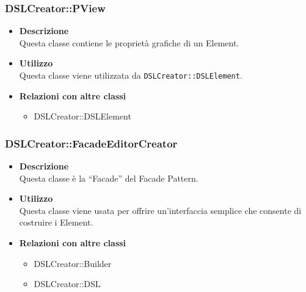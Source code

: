         \subsubsection{DSLCreator::PView}
        \begin{itemize}
        \item \textbf{Descrizione} \hfill \\
          Questa classe contiene le proprietà grafiche di un  Element.
        \item \textbf{Utilizzo}  \hfill \\
          Questa classe viene utilizzata da \texttt{DSLCreator::DSLElement}.
        \item \textbf{Relazioni con altre classi} \hfill 
          \begin{itemize}
          \item DSLCreator::DSLElement
          \end{itemize}
        \end{itemize}

        \subsubsection{DSLCreator::FacadeEditorCreator}
        \begin{itemize}
        \item \textbf{Descrizione} \hfill \\
          Questa classe è la ``Facade'' del Facade Pattern.
        \item \textbf{Utilizzo}  \hfill \\
          Questa classe viene usata per offrire un'interfaccia semplice che consente di costruire i  Element.
        \item \textbf{Relazioni con altre classi} \hfill 
          \begin{itemize}
          \item DSLCreator::Builder
          \item DSLCreator::DSL
          \end{itemize}
        \end{itemize}

